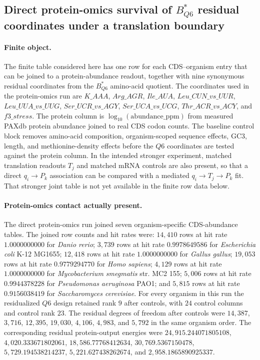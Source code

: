\subsection{Direct protein-omics survival of $B^{*}_{Q6}$ residual coordinates under a translation boundary}
\label{sec:q6-direct-protein-omics-survival-translation-boundary}

\paragraph{Finite object.}
The finite table considered here has one row for each CDS--organism entry that can be joined to a protein-abundance readout, together with nine synonymous residual coordinates from the $B^{*}_{Q6}$ amino-acid quotient. The coordinates used in the protein-omics run are $K\_AAA$, $Arg\_AGR$, $Ile\_AUA$, $Leu\_CUN\_vs\_UUR$, $Leu\_UUA\_vs\_UUG$, $Ser\_UCR\_vs\_AGY$, $Ser\_UCA\_vs\_UCG$, $Thr\_ACR\_vs\_ACY$, and $f3\_stress$. The protein column is $\log_{10}(\mathrm{abundance\_ppm})$ from measured PAXdb protein abundance joined to real CDS codon counts. The baseline control block removes amino-acid composition, organism-scoped sequence effects, GC3, length, and methionine-density effects before the $Q6$ coordinates are tested against the protein column. In the intended stronger experiment, matched translation readouts $T_j$ and matched mRNA controls are also present, so that a direct $q_i \to P_k$ association can be compared with a mediated $q_i \to T_j \to P_k$ fit. That stronger joint table is not yet available in the finite row data below.

\paragraph{Protein-omics contact actually present.}
The direct protein-omics run joined seven organism-specific CDS-abundance tables. The joined row counts and hit rates were: $14{,}410$ rows at hit rate $1.0000000000$ for \textit{Danio rerio}; $3{,}739$ rows at hit rate $0.9978649586$ for \textit{Escherichia coli} K-12 MG1655; $12{,}418$ rows at hit rate $1.0000000000$ for \textit{Gallus gallus}; $19{,}053$ rows at hit rate $0.9779294770$ for \textit{Homo sapiens}; $4{,}129$ rows at hit rate $1.0000000000$ for \textit{Mycobacterium smegmatis} str. MC2 155; $5{,}006$ rows at hit rate $0.9944378228$ for \textit{Pseudomonas aeruginosa} PAO1; and $5{,}815$ rows at hit rate $0.9156038419$ for \textit{Saccharomyces cerevisiae}. For every organism in this run the residualized $Q6$ design retained rank $9$ after controls, with $24$ control columns and control rank $23$. The residual degrees of freedom after controls were $14{,}387$, $3{,}716$, $12{,}395$, $19{,}030$, $4{,}106$, $4{,}983$, and $5{,}792$ in the same organism order. The corresponding residual protein-output energies were $24{,}915.244071805108$, $4{,}020.333671802061$, $18{,}586.77768412634$, $30{,}769.5367150478$, $5{,}729.194538214237$, $5{,}221.627438262674$, and $2{,}958.1865890925337$.

